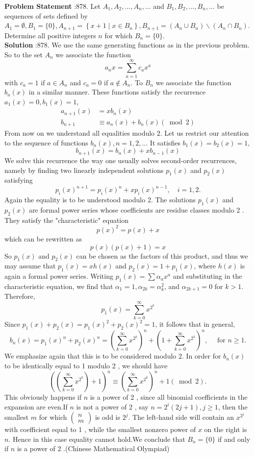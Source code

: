 \documentclass[10pt]{article}
\begin{document}
\textbf{Problem Statement} :878. Let $A_{1}, A_{2}, \ldots, A_{n}, \ldots$ and $B_{1}, B_{2}, \ldots, B_{n}, \ldots$ be sequences of sets defined by $A_{1}=\emptyset, B_{1}=\{0\}, A_{n+1}=\left\{x+1 \mid x \in B_{n}\right\}, B_{n+1}=\left(A_{n} \cup B_{n}\right) \backslash\left(A_{n} \cap B_{n}\right)$. Determine all positive integers $n$ for which $B_{n}=\{0\}$.\\
\textbf{Solution} :878. We use the same generating functions as in the previous problem. So to the set $A_{n}$ we associate the function $$ a_{n} x=\sum_{a=1}^{\infty} c_{a} x^{a} $$with $c_{a}=1$ if $a \in A_{n}$ and $c_{a}=0$ if $a \notin A_{n}$. To $B_{n}$ we associate the function $b_{n}(x)$ in a similar manner. These functions satisfy the recurrence $a_{1}(x)=0, b_{1}(x)=1$,$$ \begin{aligned} a_{n+1}(x) &=x b_{n}(x) \\ b_{n+1} & \equiv a_{n}(x)+b_{n}(x)(\bmod 2) \end{aligned} $$From now on we understand all equalities modulo 2. Let us restrict our attention to the sequence of functions $b_{n}(x), n=1,2, \ldots$ It satisfies $b_{1}(x)=b_{2}(x)=1$,$$ b_{n+1}(x)=b_{n}(x)+x b_{n-1}(x) $$We solve this recurrence the way one usually solves second-order recurrences, namely by finding two linearly independent solutions $p_{1}(x)$ and $p_{2}(x)$ satisfying$$ p_{i}(x)^{n+1}=p_{i}(x)^{n}+x p_{i}(x)^{n-1}, \quad i=1,2 . $$Again the equality is to be understood modulo 2. The solutions $p_{1}(x)$ and $p_{2}(x)$ are formal power series whose coefficients are residue classes modulo 2 . They satisfy the "characteristic" equation$$ p(x)^{2}=p(x)+x $$which can be rewritten as$$ p(x)(p(x)+1)=x $$So $p_{1}(x)$ and $p_{2}(x)$ can be chosen as the factors of this product, and thus we may assume that $p_{1}(x)=x h(x)$ and $p_{2}(x)=1+p_{1}(x)$, where $h(x)$ is again a formal power series. Writing $p_{1}(x)=\sum \alpha_{a} x^{a}$ and substituting in the characteristic equation, we find that $\alpha_{1}=1, \alpha_{2 k}=\alpha_{k}^{2}$, and $\alpha_{2 k+1}=0$ for $k>1$. Therefore,$$ p_{1}(x)=\sum_{k=0}^{\infty} x^{2^{k}} $$Since $p_{1}(x)+p_{2}(x)=p_{1}(x)^{2}+p_{2}(x)^{2}=1$, it follows that in general,$$ b_{n}(x)=p_{1}(x)^{n}+p_{2}(x)^{n}=\left(\sum_{k=0}^{\infty} x^{2^{k}}\right)^{n}+\left(1+\sum_{k=0}^{\infty} x^{2^{k}}\right)^{n}, \quad \text { for } n \geq 1 . $$We emphasize again that this is to be considered modulo 2. In order for $b_{n}(x)$ to be identically equal to 1 modulo 2 , we should have$$ \left(\left(\sum_{k=0}^{\infty} x^{2^{k}}\right)+1\right)^{n} \equiv\left(\sum_{k=0}^{\infty} x^{2^{k}}\right)^{n}+1(\bmod 2) . $$This obviously happens if $n$ is a power of 2 , since all binomial coefficients in the expansion are even.If $n$ is not a power of 2 , say $n=2^{i}(2 j+1), j \geq 1$, then the smallest $m$ for which $\left(\begin{array}{l}n \\ m\end{array}\right)$ is odd is $2^{j}$. The left-hand side will contain an $x^{2^{j}}$ with coefficient equal to 1 , while the smallest nonzero power of $x$ on the right is $n$. Hence in this case equality cannot hold.We conclude that $B_{n}=\{0\}$ if and only if $n$ is a power of 2 .(Chinese Mathematical Olympiad)\\
\end{document}
